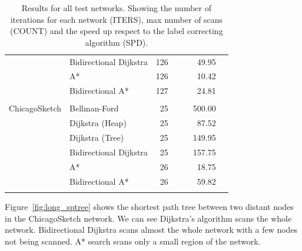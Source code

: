 \begin{table}
\begin{tabular}{l l r rr rr }
        & Bidirectional Dijkstra  & 126 & & & 49.95 & \\
        & A*    & 126 & & & 10.42 & \\
        & Bidirectional A* & 127 & & & 24.81 & \\ \\
        ChicagoSketch & Bellman-Ford    & 25 & & & 500.00 & \\
        & Dijkstra (Heap) & 25 & & & 87.52 & \\
        & Dijkstra (Tree) & 25 & & & 149.95 & \\
        & Bidirectional Dijkstra  & 25 & & & 157.75 & \\
        & A*    & 26 & & & 18.75 & \\
        & Bidirectional A* & 26 & & & 59.82 & \\ \\
        \bottomrule
    \end{tabular}
    \caption{Results for all test networks. Showing the number of iterations for each network (ITERS), max number of scans (COUNT) and the speed up respect to the label correcting algorithm (SPD). }
    \label{table:allresults}
\end{table}

Figure~\ref{fig:long_sptree} shows the shortest path tree between two distant nodes in the ChicagoSketch network.
We can see Dijkstra's algorithm scans the whole network.
Bidirectional Dijkstra scans almost the whole network with a few nodes not being scanned.
A* search scans only a small region of the network.

